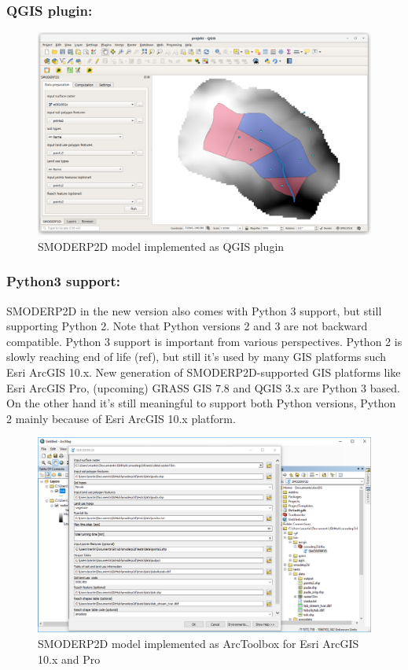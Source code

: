 \subsubsection{QGIS plugin:}

\begin{figure}[ht!]
  \begin{center}
    \includegraphics[width=1.0\columnwidth]{figures/smoderp2d_qgis.png}
    \caption{SMODERP2D model implemented as QGIS plugin}
    \label{fig:uml_diagram}
  \end{center}
\end{figure}

\subsubsection{Python3 support:}
SMODERP2D in the new version also comes with Python 3 support, but
still supporting Python 2. Note that Python versions 2 and 3 are not
backward compatible.  Python 3 support is important from various
perspectives. Python 2 is slowly reaching end of life (ref), but still
it’s used by many GIS platforms such Esri ArcGIS 10.x. New generation
of SMODERP2D-supported GIS platforms like Esri ArcGIS Pro, (upcoming)
GRASS GIS 7.8 and QGIS 3.x are Python 3 based. On the other hand it’s
still meaningful to support both Python versions, Python 2 mainly
because of Esri ArcGIS 10.x platform.

\begin{figure}[ht!]
  \begin{center}
    \includegraphics[width=1.0\columnwidth]{figures/smoderp2d_arcgis.png}
    \caption{SMODERP2D model implemented as ArcToolbox for Esri ArcGIS
      10.x and Pro}
    \label{fig:uml_diagram}
  \end{center}
\end{figure}
